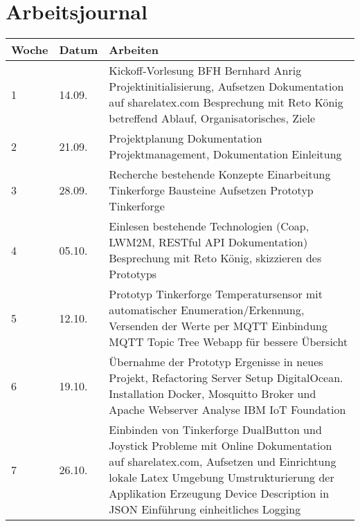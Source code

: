 \chapter{Arbeitsjournal}
\label{chap:arbeitsjournal}

\begin{table}[h!]
\begin{tabularx}{\textwidth}{|l|l|X|}

 \hline
 {\bf Woche } & {\bf Datum }  & {\bf Arbeiten }  \\ 
 \hline
  1  & 14.09. &  Kickoff-Vorlesung BFH Bernhard Anrig \newline Projektinitialisierung, Aufsetzen Dokumentation auf sharelatex.com \newline Besprechung mit Reto König betreffend Ablauf, Organisatorisches, Ziele  \\ \hline
 
  2  & 21.09. &  Projektplanung \newline Dokumentation Projektmanagement, Dokumentation Einleitung    \\ \hline
  3  & 28.09. &  Recherche bestehende Konzepte \newline Einarbeitung Tinkerforge Bausteine \newline Aufsetzen Prototyp Tinkerforge   \\ \hline
  
  4  & 05.10. &  Einlesen bestehende Technologien (Coap, LWM2M, RESTful API Dokumentation) \newline Besprechung mit Reto König, skizzieren des Prototyps     \\ \hline
  
  5  & 12.10. &  Prototyp Tinkerforge Temperatursensor mit automatischer Enumeration/Erkennung, Versenden der Werte per MQTT \newline Einbindung MQTT Topic Tree Webapp für bessere Übersicht     \\ \hline
  
  6  & 19.10. &  Übernahme der Prototyp Ergenisse in neues Projekt, Refactoring  \newline Server Setup DigitalOcean. Installation Docker, Mosquitto Broker und Apache Webserver \newline Analyse IBM IoT Foundation      \\ \hline
  
  7  & 26.10. &  Einbinden von Tinkerforge DualButton und Joystick \newline Probleme mit Online Dokumentation auf sharelatex.com, Aufsetzen und Einrichtung lokale Latex Umgebung \newline Umstrukturierung der Applikation \newline Erzeugung Device Description in JSON \newline Einführung einheitliches Logging     \\ \hline
  

\end{tabularx}
\end{table}
